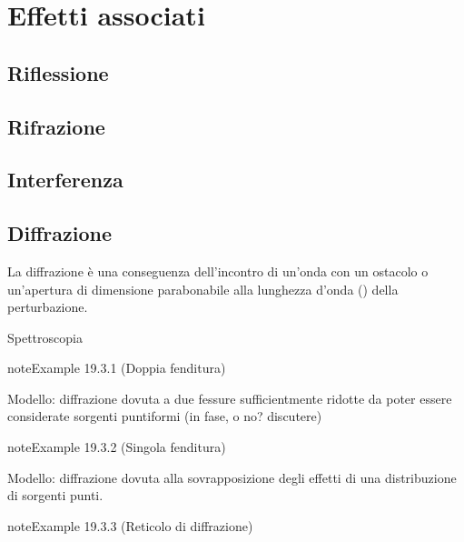 \documentclass[letterpaper,10pt,italian]{jupyterBook}
\begin{document}
\section{Effetti associati}
\label{\detokenize{ch/waves/intro:effetti-associati}}\label{\detokenize{ch/waves/intro:physics-hs-waves-effects}}

\subsection{Riflessione}
\label{\detokenize{ch/waves/intro:riflessione}}\label{\detokenize{ch/waves/intro:physics-hs-waves-effects-reflection}}

\subsection{Rifrazione}
\label{\detokenize{ch/waves/intro:rifrazione}}\label{\detokenize{ch/waves/intro:physics-hs-waves-effects-refraction}}

\subsection{Interferenza}
\label{\detokenize{ch/waves/intro:interferenza}}\label{\detokenize{ch/waves/intro:physics-hs-waves-effects-interference}}

\subsection{Diffrazione}
\label{\detokenize{ch/waves/intro:diffrazione}}\label{\detokenize{ch/waves/intro:physics-hs-waves-effects-diffraction}}
\sphinxAtStartPar
La diffrazione è una conseguenza dell’incontro di un’onda con un ostacolo o un’apertura di dimensione parabonabile alla lunghezza d’onda ({\hyperref[\detokenize{ch/waves/intro:wave-length}]{}}) della perturbazione.

\sphinxAtStartPar
{} Spettroscopia
\label{ch/waves/intro:example-3}
\begin{sphinxadmonition}{note}{Example 19.3.1 (Doppia fenditura)}



\sphinxAtStartPar
Modello: diffrazione dovuta a due fessure sufficientmente ridotte da poter essere considerate sorgenti puntiformi (in fase, o no? discutere)
\end{sphinxadmonition}
\label{ch/waves/intro:example-4}
\begin{sphinxadmonition}{note}{Example 19.3.2 (Singola fenditura)}



\sphinxAtStartPar
Modello: diffrazione dovuta alla sovrapposizione degli effetti di una distribuzione di sorgenti punti.
\end{sphinxadmonition}
\label{ch/waves/intro:example-5}
\begin{sphinxadmonition}{note}{Example 19.3.3 (Reticolo di diffrazione)}


\end{sphinxadmonition}
\end{document}
